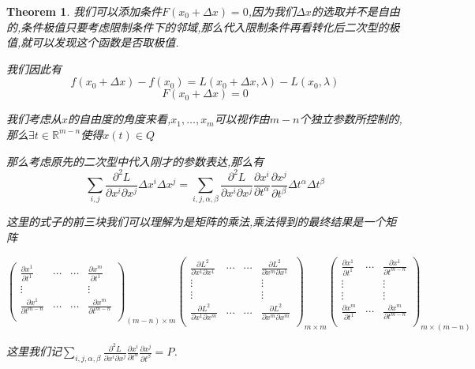 \documentclass[11pt,hyperref,a4paper,UTF8]{ctexart}
\newtheorem{theorem}{Theorem}[subsection]
\newcommand{\RR}{\mathbb{R}}
\begin{document}
\begin{CJK}{UTF8}{gkai}
\begin{theorem}
我们可以添加条件$F(x_0 + \Delta x) = 0$,因为我们$\Delta x$的选取并不是自由的,条件极值只要考虑限制条件下的邻域,那么代入限制条件再看转化后二次型的极值,就可以发现这个函数是否取极值.

我们因此有
\[f(x_0 + \Delta x) - f(x_0) = L(x_0 + \Delta x,\lambda) - L(x_0,\lambda)\]
\[F(x_0 + \Delta x) = 0\]

我们考虑从$x$的自由度的角度来看,$x_1,\ldots,x_m$可以视作由$m - n$个独立参数所控制的,那么$\exists t \in \RR^{m - n}$使得$x(t) \in Q$

那么考虑原先的二次型中代入刚才的参数表达,那么有
\[\sum_{i,j} \frac{\partial^2 L}{\partial x^i \partial x^j} \Delta x^i \Delta x^j = \sum_{i,j,\alpha,\beta} \frac{\partial^2 L}{\partial x^i \partial x^j} \frac{\partial x^i}{\partial t^\alpha} \frac{\partial x^j}{\partial t^\beta} \Delta t^\alpha \Delta t^\beta\]

这里的式子的前三块我们可以理解为是矩阵的乘法,乘法得到的最终结果是一个矩阵

\[\begin{pmatrix}
  \frac{\partial x^1}{\partial t^1}&\cdots&\cdots&\frac{\partial x^m}{\partial t^1}\\
  \vdots&&&\vdots\\
  \frac{\partial x^1}{\partial t^{m - n}}&\cdots&\cdots&\frac{\partial x^m}{\partial t^{m - n}}\\
\end{pmatrix}_{(m - n) \times m}
\begin{pmatrix}
  \frac{\partial L^2}{\partial x^1 \partial x^1}&\cdots&\cdots&\frac{\partial L^2}{\partial x^m \partial x^1}\\
  \vdots&&&\vdots\\
  \vdots&&&\vdots\\ 
  \frac{\partial L^2}{\partial x^1 \partial x^m}&\cdots&\cdots&\frac{\partial L^2}{\partial x^m \partial x^m}\\
\end{pmatrix}_{m \times m}
\begin{pmatrix}
  \frac{\partial x^1}{\partial t^1}&\cdots&\frac{\partial x^1}{\partial t^{m - n}}\\
  \vdots&&\vdots\\
  \vdots&&\vdots\\
  \frac{\partial x^m}{\partial t^1}&\cdots&\frac{\partial x^m}{\partial t^{m - n}}\\
\end{pmatrix}_{m \times (m - n)}
\]

这里我们记$\sum_{i,j,\alpha,\beta} \frac{\partial^2 L}{\partial x^i \partial x^j} \frac{\partial x^i}{\partial t^\alpha} \frac{\partial x^j}{\partial t^\beta} = P$.


\end{theorem}
\end{CJK}
\end{document}
